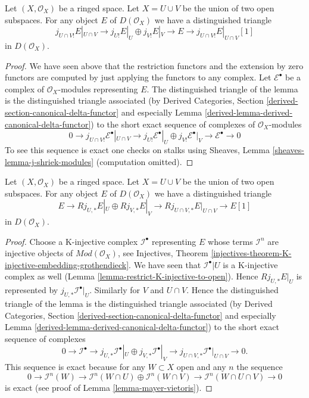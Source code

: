 \begin{lemma}
\label{lemma-exact-sequence-lower-shriek}
Let $(X, \mathcal{O}_X)$ be a ringed space.
Let $X = U \cup V$ be the union of two open subspaces.
For any object $E$ of $D(\mathcal{O}_X)$ we have a distinguished
triangle
$$
j_{U \cap V!}E|_{U \cap V} \to
j_{U!}E|_U \oplus j_{V!}E|_V \to E \to 
j_{U \cap V!}E|_{U \cap V}[1]
$$
in $D(\mathcal{O}_X)$.
\end{lemma}

\begin{proof}
We have seen above that the restriction functors and the extension
by zero functors are computed by just applying the functors to
any complex. Let $\mathcal{E}^\bullet$ be a complex of $\mathcal{O}_X$-modules
representing $E$. The distinguished triangle of the lemma is the
distinguished triangle associated (by
Derived Categories, Section
\ref{derived-section-canonical-delta-functor} and especially
Lemma \ref{derived-lemma-derived-canonical-delta-functor})
to the short exact sequence of complexes of $\mathcal{O}_X$-modules
$$
0 \to j_{U \cap V!}\mathcal{E}^\bullet|_{U \cap V} \to
j_{U!}\mathcal{E}^\bullet|_U \oplus j_{V!}\mathcal{E}^\bullet|_V
\to \mathcal{E}^\bullet \to 0
$$
To see this sequence is exact one checks on stalks using
Sheaves, Lemma \ref{sheaves-lemma-j-shriek-modules}
(computation omitted).
\end{proof}

\begin{lemma}
\label{lemma-exact-sequence-j-star}
Let $(X, \mathcal{O}_X)$ be a ringed space.
Let $X = U \cup V$ be the union of two open subspaces.
For any object $E$ of $D(\mathcal{O}_X)$ we have a distinguished
triangle
$$
E \to 
Rj_{U, *}E|_U \oplus Rj_{V, *}E|_V \to
Rj_{U \cap V, *}E|_{U \cap V} \to
E[1]
$$
in $D(\mathcal{O}_X)$.
\end{lemma}

\begin{proof}
Choose a K-injective complex $\mathcal{I}^\bullet$ representing $E$
whose terms $\mathcal{I}^n$ are injective objects of
$\textit{Mod}(\mathcal{O}_X)$, see Injectives, Theorem
\ref{injectives-theorem-K-injective-embedding-grothendieck}.
We have seen that $\mathcal{I}^\bullet|U$ is a K-injective complex
as well (Lemma \ref{lemma-restrict-K-injective-to-open}). Hence
$Rj_{U, *}E|_U$ is represented by $j_{U, *}\mathcal{I}^\bullet|_U$.
Similarly for $V$ and $U \cap V$. Hence the distinguished triangle
of the lemma is the distinguished triangle associated (by
Derived Categories, Section
\ref{derived-section-canonical-delta-functor} and especially
Lemma \ref{derived-lemma-derived-canonical-delta-functor})
to the short exact sequence of complexes
$$
0 \to
\mathcal{I}^\bullet \to
j_{U, *}\mathcal{I}^\bullet|_U \oplus j_{V, *}\mathcal{I}^\bullet|_V \to
j_{U \cap V, *}\mathcal{I}^\bullet|_{U \cap V} \to
0.
$$
This sequence is exact because for any $W \subset X$ open
and any $n$ the sequence
$$
0 \to
\mathcal{I}^n(W) \to
\mathcal{I}^n(W \cap U) \oplus \mathcal{I}^n(W \cap V) \to
\mathcal{I}^n(W \cap U \cap V) \to
0
$$
is exact (see proof of Lemma \ref{lemma-mayer-vietoris}).
\end{proof}

